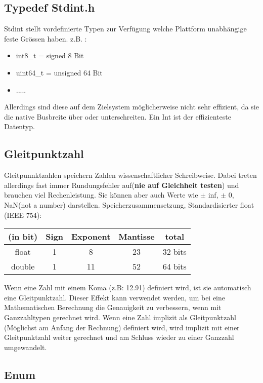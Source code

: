 \subsection{Typedef Stdint.h}

Stdint stellt vordefinierte Typen zur Verfügung welche Plattform unabhängige feste Grössen haben. z.B. :
\begin{itemize}[itemsep=1pt, parsep=0pt]
    \item int8\_t = signed 8 Bit
    \item uint64\_t = unsigned 64 Bit
    \item .....
\end{itemize}
Allerdings sind diese auf dem Zielsystem möglicherweise nicht sehr effizient, da sie die native Busbreite über oder unterschreiten. Ein Int ist der effizienteste Datentyp.

\subsection{Gleitpunktzahl}

Gleitpunnktzahlen speichern Zahlen wissenschaftlicher Schreibweise. Dabei treten allerdings fast immer Rundungsfehler auf(\textbf{nie auf Gleichheit testen}) und brauchen viel Rechenleistung. Sie können aber auch Werte wie $\pm$ inf, $\pm$ 0, NaN(not a number) darstellen.\newline
Speicherzusammensetzung, Standardisierter float (IEEE 754): 
\begin{center}
    \begin{tabular}{|c|c|c|c|c|} \hline  
        (in bit) & Sign  & Exponent & Mantisse & total\\ \hline  
        float & 1 & 8 & 23 & 32 bits\\ \hline  
        double & 1 & 11 & 52 & 64 bits\\ \hline   
    \end{tabular}
\end{center}

Wenn eine Zahl mit einem Koma (z.B: 12.91) definiert wird, ist sie automatisch eine Gleitpunktzahl. Dieser Effekt kann verwendet werden, um bei eine Mathematischen Berechnung die Genauigkeit zu verbessern, wenn mit Ganzzahltypen gerechnet wird. Wenn eine Zahl implizit als Gleitpunktzahl (Möglichst am Anfang der Rechnung) definiert wird, wird implizit mit einer Gleitpunktzahl weiter gerechnet und am Schluss wieder zu einer Ganzzahl umgewandelt.

\subsection{Enum}

